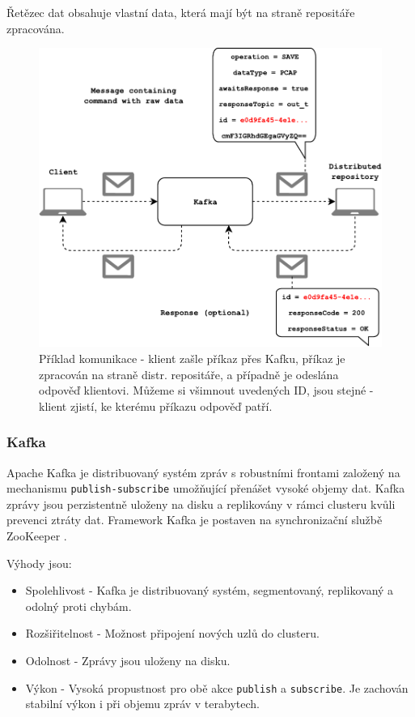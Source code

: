 \noindent Řetězec dat obsahuje vlastní data, která mají být na straně repositáře zpracována.

\begin{figure}[!h]
  \centering
  \includegraphics[width=15cm]{template-fig/Kafka_communication.pdf}
  \caption{Příklad komunikace - klient zašle příkaz přes Kafku, příkaz je zpracován na straně distr. repositáře, a případně je odeslána odpověď klientovi. Můžeme si všimnout uvedených ID, jsou stejné - klient zjistí, ke kterému příkazu odpověď patří.}
  \label{FIG_KafkaCommunication}
\end{figure}

\subsubsection{Kafka}
Apache Kafka je distribuovaný systém zpráv s robustními frontami založený na mechanismu \texttt{publish-subscribe} umožňující přenášet vysoké objemy dat. Kafka zprávy jsou perzistentně uloženy na disku a replikovány v rámci clusteru kvůli prevenci ztráty dat. Framework Kafka je postaven na synchronizační službě ZooKeeper \cite{kafkaTutorialsPoint}.

\vspace{0.5cm}
\noindent Výhody jsou:
\begin{itemize}
    \item Spolehlivost - Kafka je distribuovaný systém, segmentovaný, replikovaný a odolný proti chybám.
    \item Rozšiřitelnost - Možnost připojení nových uzlů do clusteru.
    \item Odolnost - Zprávy jsou uloženy na disku.
    \item Výkon - Vysoká propustnost pro obě akce \texttt{publish} a \texttt{subscribe}. Je zachován stabilní výkon i při objemu zpráv v terabytech.
\end{itemize}

